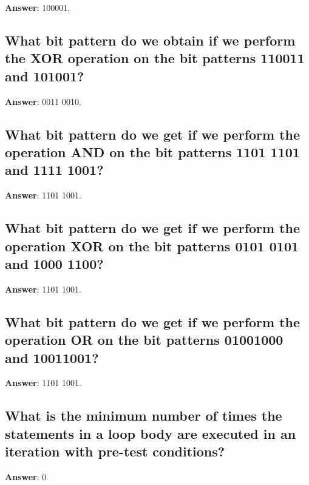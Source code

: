 \documentclass[a4paper,11pt,oneside]{article}
\begin{document}
\begin{sloppypar}
\label{q:415:sa:en:True}

\textbf{Answer}: 100001.



\subsection{What bit pattern do we obtain if we perform the XOR operation on the bit patterns 110011 and 101001?}

\label{q:416:sa:en:True}

\textbf{Answer}: 0011 0010.



\subsection{What bit pattern do we get if we perform the operation AND on the bit patterns 1101 1101 and 1111 1001?}

\label{q:417:sa:en:True}

\textbf{Answer}: 1101 1001.



\subsection{What bit pattern do we get if we perform the operation XOR on the bit patterns 0101 0101 and 1000 1100?}

\label{q:418:sa:en:True}

\textbf{Answer}: 1101 1001.



\subsection{What bit pattern do we get if we perform the operation OR on the bit patterns 01001000 and 10011001?}

\label{q:419:sa:en:True}

\textbf{Answer}: 1101 1001.



\subsection{What is the minimum number of times the statements in a loop body are executed in an iteration with pre-test conditions?}

\label{q:420:sa:en:True}

\textbf{Answer}: 0




\end{sloppypar}
\end{document}

